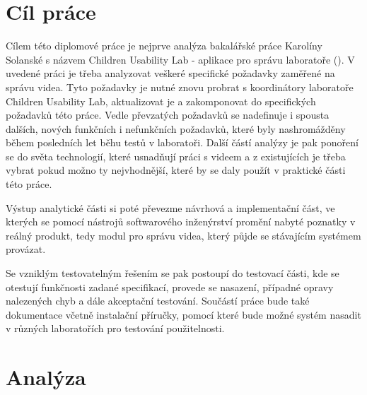 \documentclass[thesis=M,czech]{FITthesis}[2012/06/26]
\begin{document}
\chapter{Cíl práce}
Cílem této diplomové práce je nejprve analýza bakalářské práce Karolíny Solanské s názvem Children Usability Lab - aplikace pro správu laboratoře (\cite{solankar}). V uvedené práci je třeba analyzovat veškeré specifické požadavky zaměřené na správu videa. Tyto požadavky je nutné znovu probrat s koordinátory  laboratoře Children Usability Lab, aktualizovat je a zakomponovat do specifických požadavků této práce. Vedle převzatých požadavků se nadefinuje i spousta dalších, nových funkčních i nefunkčních požadavků, které byly nashromážděny během posledních let běhu testů v laboratoři. Další částí analýzy je pak ponoření se do světa technologií, které usnadňují práci s videem a z existujících je třeba vybrat pokud možno ty nejvhodnější, které by se daly použít v praktické části této práce.
	
	Výstup analytické části si poté převezme návrhová a implementační část, ve kterých se pomocí nástrojů softwarového inženýrství promění nabyté poznatky v reálný produkt, tedy modul pro správu videa, který půjde se stávajícím systémem provázat.
	
	Se vzniklým testovatelným řešením se pak postoupí do testovací části, kde se otestují funkčnosti zadané specifikací, provede se nasazení, případné opravy nalezených chyb a dále akceptační testování.
Součástí práce bude také dokumentace včetně instalační příručky, pomocí které bude možné systém nasadit v různých laboratořích pro testování použitelnosti.

\chapter{Analýza}
\end{document}
